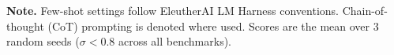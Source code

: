 \vspace{6pt}

\begin{infobox}
  \textbf{Note.} Few-shot settings follow EleutherAI LM Harness conventions.
  Chain-of-thought (CoT) prompting is denoted where used. Scores are the mean
  over 3 random seeds ($\sigma < 0.8$ across all benchmarks).
\end{infobox}

